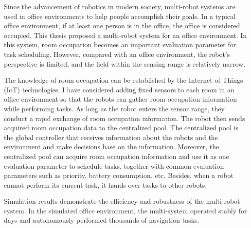 
Since the advancement of robotics in modern society, multi-robot systems are used in office environments to help people accomplish their goals. In a typical office environment, if at least one person is in the office, the office is considered occupied. This thesis proposed a multi-robot system for an office environment. In this system, room occupation becomes an important evaluation parameter for task scheduling. However, compared with an office environment, the robot's perspective is limited, and the field within the sensing range is relatively narrow.

The knowledge of room occupation can be established by the Internet of Things (IoT) technologies. I have considered adding fixed sensors to each room in an office environment so that the robots can gather room occupation information while performing tasks. As long as the robot enters the sensor range, they conduct a rapid exchange of room occupation information. The robot then sends acquired room occupation data to the centralized pool. The centralized pool is the global controller that receives information about the robots and the environment and make decisions base on the information. 
Moreover, the centralized pool can acquire room occupation information and use it as one evaluation parameter to schedule tasks, together with common evaluation parameters such as priority, battery consumption, etc. Besides, when a robot cannot perform its current task, it hands over tasks to other robots. 

Simulation results demonstrate the efficiency and robustness of the multi-robot system. In the simulated office environment, the multi-system operated stably for days and autonomously performed thousands of navigation tasks. 


\cleardoublepage
